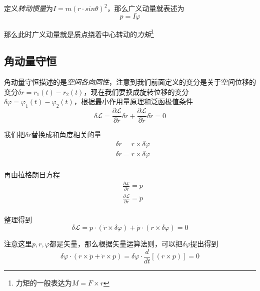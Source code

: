 定义\textsl{转动惯量}为$I=m(r\cdot sin\theta)^2$，那么广义动量就表述为
\begin{equation}
    p=I\dot{\varphi}
\end{equation}

那么此时广义动量就是质点绕着中心转动的\textsl{力矩}\footnote{力矩的一般表达为$M=F\times r$}

\subsection*{角动量守恒}

角动量守恒描述的是\textsl{空间各向同性}，注意到我们前面定义的变分是关于空间位移的变分$\delta r=r_1(t)-r_2(t)$，现在我们要换成旋转位移的变分$\delta \varphi=\varphi_1(t)-\varphi_2(t)$，根据最小作用量原理和泛函极值条件
\begin{equation}
    \delta \mathcal{L}=\frac{\partial \mathcal{L}}{\partial r}\delta r+\frac{\partial \mathcal{L}}{\partial \dot{r}}\delta \dot{r}=0
\end{equation}

我们把$\delta r$替换成和角度相关的量
\begin{equation}
    \begin{aligned}
        & \delta r=r\times \delta \varphi\\
        & \delta\dot{r} =\dot{r}\times \delta \varphi\\
    \end{aligned}
\end{equation}

再由拉格朗日方程
\begin{equation}
    \begin{aligned}
        & \frac{\partial \mathcal{L}}{\partial \dot{r}}=p\\
        & \frac{\partial \mathcal{L}}{\partial r}=\dot{p}\\
    \end{aligned}
\end{equation}

整理得到
\begin{equation}
    \delta \mathcal{L}=p\cdot(\dot{r}\times \delta\varphi)+\dot{p}\cdot(r\times \delta \varphi)=0
\end{equation}

注意这里$p,r,\varphi$都是矢量，那么根据矢量运算法则，可以把$\delta\varphi$提出得到
\begin{equation}
    \delta \varphi\cdot(r\times \dot{p}+\dot{r}\times p)=\delta \varphi\cdot\frac{d}{dt}\left[(r\times p)\right]=0
\end{equation}

